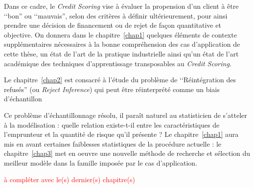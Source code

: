 Dans ce cadre, le \textit{Credit Scoring} vise à évaluer la propension d'un client à être ‘‘bon'' ou ‘‘mauvais'', selon des critères à définir ultérieurement, pour ainsi prendre une décision de financement ou de rejet de façon quantitative et objective. On donnera dans le chapitre~\ref{chap1} quelques éléments de contexte supplémentaires nécessaires à la bonne compréhension des cas d'application de cette thèse, un état de l'art de la pratique industrielle ainsi qu'un état de l'art académique des techniques d'apprentissage transposables au \textit{Credit Scoring}.

Le chapitre~\ref{chap2} est consacré à l'étude du problème de ‘‘Réintégration des refusés'' (ou \textit{Reject Inference}) qui peut être réinterprété comme un biais d'échantillon 

Ce problème d'échantillonnage résolu, il paraît naturel au statisticien de s'atteler à la modélisation : quelle relation existe-t-il entre les caractéristiques de l'emprunteur et la quantité de risque qu'il présente ? Le chapitre~\ref{chap1} aura mis en avant certaines faiblesses statistiques de la procédure actuelle : le chapitre~\ref{chap3} met en oeuvre une nouvelle méthode de recherche et sélection du meilleur modèle dans la famille imposée par le cas d'application.

\textcolor{red}{à compléter avec le(s) dernier(s) chapitre(s)}

\printbibliography[heading=subbibliography, title=Références de l'introduction]
